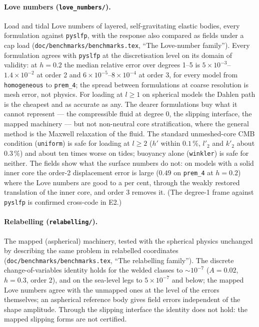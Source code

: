 \documentclass[11pt]{article}
\numberwithin{equation}{section}
\newcommand{\code}[1]{\texttt{#1}}
\begin{document}
\paragraph{Love numbers (\code{love\_numbers/}).} Load and tidal Love
numbers of layered, self-gravitating elastic bodies, every formulation
against \code{pyslfp}, with the response also compared as fields under a cap
load (\code{doc/benchmarks/benchmarks.tex}, ``The Love-number family''). Every
formulation agrees with \code{pyslfp} at the discretisation level on its
domain of validity: at $h=0.2$ the median relative error over degrees 1--5
is $5\times10^{-3}$--$1.4\times10^{-2}$ at order 2 and
$6\times10^{-5}$--$8\times10^{-4}$ at order 3, for every model from
\code{homogeneous} to \code{prem\_4}; the spread between formulations at
coarse resolution is mesh error, not physics. For loading at $l\ge1$ on
spherical models the Dahlen path is the cheapest and as accurate as any.
The dearer formulations buy what it cannot represent --- the compressible
fluid at degree 0, the slipping interface, the mapped machinery --- but not
non-neutral core stratification, where the general method is the Maxwell
relaxation of the fluid. The standard unmeshed-core CMB condition
(\code{uniform}) is safe for loading at $l\ge2$ ($h'$ within $0.1\,\%$,
$l'_2$ and $k'_2$ about $0.3\,\%$) and about ten times worse on tides;
buoyancy alone (\code{winkler}) is safe for neither. The fields show what the
surface numbers do not: on models with a solid inner core the order-2
displacement error is large ($0.49$ on \code{prem\_4} at $h=0.2$) where the
Love numbers are good to a per cent, through the weakly restored
translation of the inner core, and order 3 removes it. (The degree-1
frame against \code{pyslfp} is confirmed cross-code in E2.)

\paragraph{Relabelling (\code{relabelling/}).} The mapped (aspherical)
machinery, tested with the spherical physics unchanged by describing the
same problem in relabelled coordinates \cite{AlAttarCrawford2016}
(\code{doc/benchmarks/benchmarks.tex}, ``The relabelling family''). The discrete
change-of-variables identity holds for the welded classes to
$\sim10^{-7}$ ($A=0.02$, $h=0.3$, order 2), and on the sea-level legs to
$5\times10^{-7}$ and below; the mapped Love numbers agree with the unmapped
ones at the level of the errors themselves; an aspherical reference body
gives field errors independent of the shape amplitude. Through the
slipping interface the identity does not hold: the mapped slipping forms are
not certified.
\end{document}
